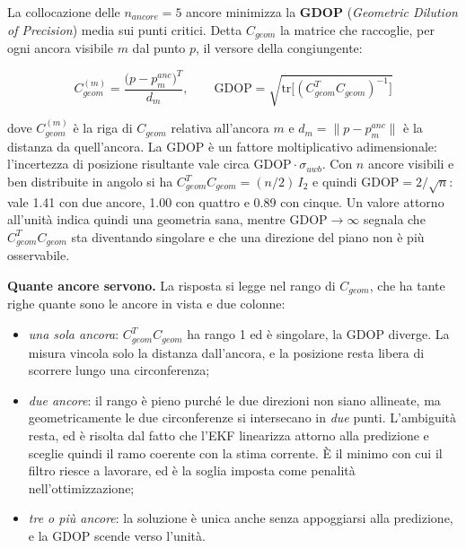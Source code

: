 \documentclass[conference,9pt]{IEEEtran}
\begin{document}
La collocazione delle $n_{ancore} = 5$ ancore minimizza la \textbf{GDOP}
(\emph{Geometric Dilution of Precision}) media sui punti critici. Detta
$C_{geom}$ la matrice che raccoglie, per ogni ancora visibile $m$ dal punto
$p$, il versore della congiungente:

\begin{equation}
C_{geom}^{(m)} = \frac{\big(p - p^{anc}_m\big)^T}{d_m},
\qquad
\mathrm{GDOP} = \sqrt{\mathrm{tr}\big[(C_{geom}^T C_{geom})^{-1}\big]}
\label{eq:gdop}
\end{equation}

dove $C_{geom}^{(m)}$ \`e la riga di $C_{geom}$ relativa all'ancora $m$ e
$d_m = \lVert p - p^{anc}_m\rVert$ \`e la distanza da quell'ancora. La
GDOP \`e un fattore moltiplicativo adimensionale: l'incertezza di posizione
risultante vale circa $\mathrm{GDOP}\cdot\sigma_{uwb}$. Con $n$ ancore
visibili e ben distribuite in angolo si ha $C_{geom}^T C_{geom} = (n/2)\,I_2$ e
quindi $\mathrm{GDOP} = 2/\sqrt{n}$: vale 1.41 con due ancore, 1.00 con quattro
e 0.89 con cinque. Un valore attorno all'unit\`a indica quindi una geometria
sana, mentre $\mathrm{GDOP} \to \infty$ segnala che $C_{geom}^T C_{geom}$ sta
diventando singolare e che una direzione del piano non \`e pi\`u osservabile.

\textbf{Quante ancore servono.} La risposta si legge nel rango di $C_{geom}$,
che ha tante righe quante sono le ancore in vista e due colonne:

\begin{itemize}
\item \emph{una sola ancora}: $C_{geom}^T C_{geom}$ ha rango 1 ed \`e
      singolare, la GDOP diverge. La misura vincola solo la distanza
      dall'ancora, e la posizione resta libera di scorrere lungo una
      circonferenza;
\item \emph{due ancore}: il rango \`e pieno purch\'e le due direzioni non siano
      allineate, ma geometricamente le due circonferenze si intersecano in
      \emph{due} punti. L'ambiguit\`a resta, ed \`e risolta dal fatto che l'EKF
      linearizza attorno alla predizione e sceglie quindi il ramo coerente con
      la stima corrente. \`E il minimo con cui il filtro riesce a lavorare, ed
      \`e la soglia imposta come penalit\`a nell'ottimizzazione;
\item \emph{tre o pi\`u ancore}: la soluzione \`e unica anche senza appoggiarsi
      alla predizione, e la GDOP scende verso l'unit\`a.
\end{itemize}
\end{document}
